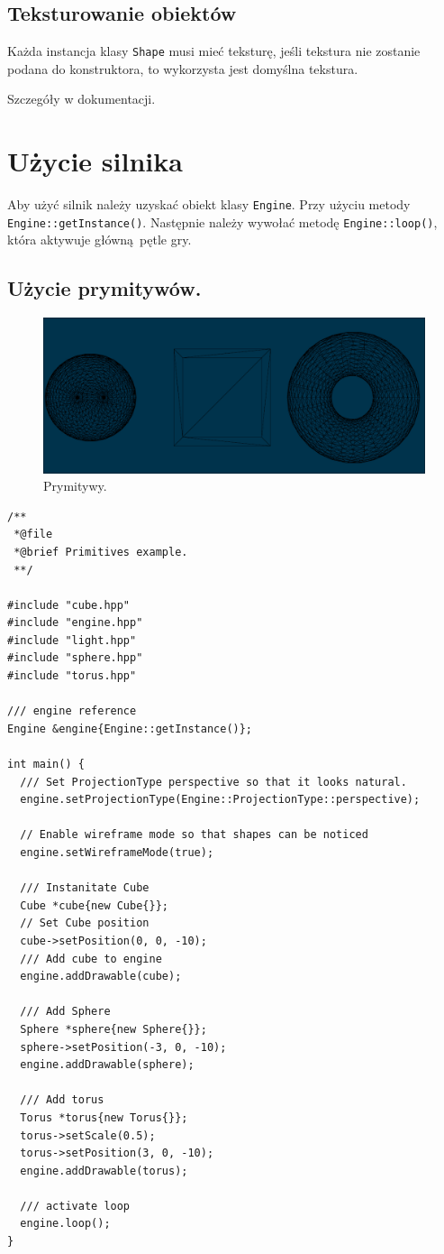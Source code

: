 \documentclass[11pt]{article}
\begin{document}
\subsection{Teksturowanie obiektów}
\label{sec:orgbf962e8}

Każda instancja klasy \texttt{Shape} musi mieć teksturę, jeśli tekstura nie zostanie podana do konstruktora, to wykorzysta jest domyślna tekstura.

Szczegóły w dokumentacji.
\section{Użycie silnika}
\label{sec:org6e6b891}
Aby użyć silnik należy uzyskać obiekt klasy \texttt{Engine}. Przy użyciu metody \texttt{Engine::getInstance()}.
Następnie należy wywołać metodę \texttt{Engine::loop()}, która aktywuje główną pętle gry.
\subsection{Użycie prymitywów.}
\label{sec:org1eaec48}
\begin{figure}[htbp]
\centering
\includegraphics[width=.9\linewidth]{img/test14.png}
\caption{Prymitywy.}
\end{figure}

\begin{verbatim}
/**
 *@file
 *@brief Primitives example.
 **/

#include "cube.hpp"
#include "engine.hpp"
#include "light.hpp"
#include "sphere.hpp"
#include "torus.hpp"

/// engine reference
Engine &engine{Engine::getInstance()};

int main() {
  /// Set ProjectionType perspective so that it looks natural.
  engine.setProjectionType(Engine::ProjectionType::perspective);

  // Enable wireframe mode so that shapes can be noticed
  engine.setWireframeMode(true);

  /// Instanitate Cube
  Cube *cube{new Cube{}};
  // Set Cube position
  cube->setPosition(0, 0, -10);
  /// Add cube to engine
  engine.addDrawable(cube);

  /// Add Sphere
  Sphere *sphere{new Sphere{}};
  sphere->setPosition(-3, 0, -10);
  engine.addDrawable(sphere);

  /// Add torus
  Torus *torus{new Torus{}};
  torus->setScale(0.5);
  torus->setPosition(3, 0, -10);
  engine.addDrawable(torus);

  /// activate loop
  engine.loop();
}
\end{verbatim}
\end{document}
